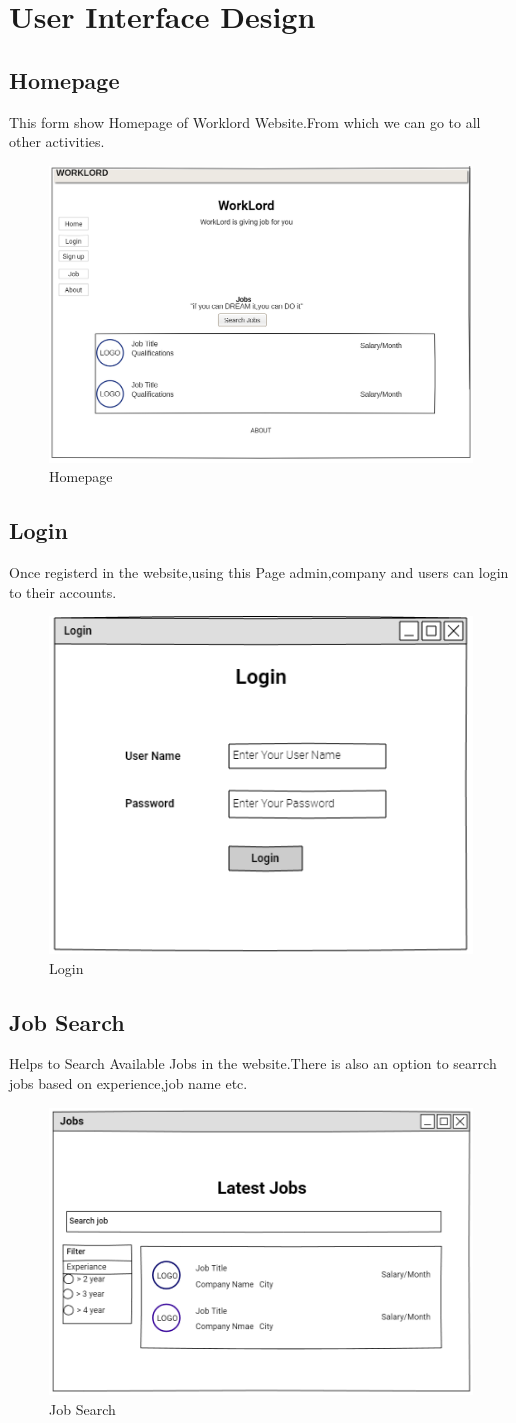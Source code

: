 \documentclass[a4paper,12pt]{report}
\begin{document}
\pagebreak
\section{User Interface Design}
\subsection {Homepage}
This form show Homepage of Worklord Website.From which we can go to all other activities.
\begin{figure}[bph]
	\centering
	\includegraphics[width=.4\linewidth]{img/homepage}
	\caption{Homepage}
\end{figure}
\subsection {Login}
Once registerd in the website,using this Page admin,company and users can login to their accounts.
\begin{figure}[bph]
	\centering
	\includegraphics[width=.4\linewidth]{img/login}
	\caption{Login}
\end{figure}
\pagebreak

\subsection {Job Search}
Helps to Search Available Jobs in the website.There is also an option to searrch jobs based on experience,job name etc.
\begin{figure}[bph]
	\centering
	\includegraphics[width=.65\linewidth]{img/usersearchjob}
	\caption{Job Search}
\end{figure}
\end{document}
